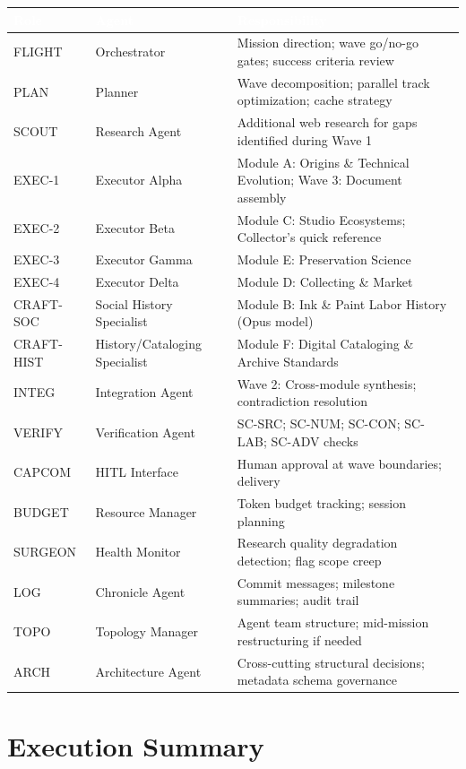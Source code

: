 \documentclass[11pt,letterpaper]{article}
\newcommand{\tableheader}[1]{\textbf{\sffamily\textcolor{white}{#1}}}
\begin{document}
\begin{center}
\begin{tabularx}{\textwidth}{L{2cm}L{3cm}X}
\toprule
{}
\tableheader{Role} & \tableheader{Agent} & \tableheader{Responsibility} \\
\midrule
FLIGHT & Orchestrator & Mission direction; wave go/no-go gates; success criteria review \\
PLAN & Planner & Wave decomposition; parallel track optimization; cache strategy \\
SCOUT & Research Agent & Additional web research for gaps identified during Wave 1 \\
EXEC-1 & Executor Alpha & Module A: Origins \& Technical Evolution; Wave 3: Document assembly \\
EXEC-2 & Executor Beta & Module C: Studio Ecosystems; Collector's quick reference \\
EXEC-3 & Executor Gamma & Module E: Preservation Science \\
EXEC-4 & Executor Delta & Module D: Collecting \& Market \\
CRAFT-SOC & Social History Specialist & Module B: Ink \& Paint Labor History (Opus model) \\
CRAFT-HIST & History/Cataloging Specialist & Module F: Digital Cataloging \& Archive Standards \\
INTEG & Integration Agent & Wave 2: Cross-module synthesis; contradiction resolution \\
VERIFY & Verification Agent & SC-SRC; SC-NUM; SC-CON; SC-LAB; SC-ADV checks \\
CAPCOM & HITL Interface & Human approval at wave boundaries; delivery \\
BUDGET & Resource Manager & Token budget tracking; session planning \\
SURGEON & Health Monitor & Research quality degradation detection; flag scope creep \\
LOG & Chronicle Agent & Commit messages; milestone summaries; audit trail \\
TOPO & Topology Manager & Agent team structure; mid-mission restructuring if needed \\
ARCH & Architecture Agent & Cross-cutting structural decisions; metadata schema governance \\
\bottomrule
\end{tabularx}
\end{center}

\section{Execution Summary}
\end{document}
